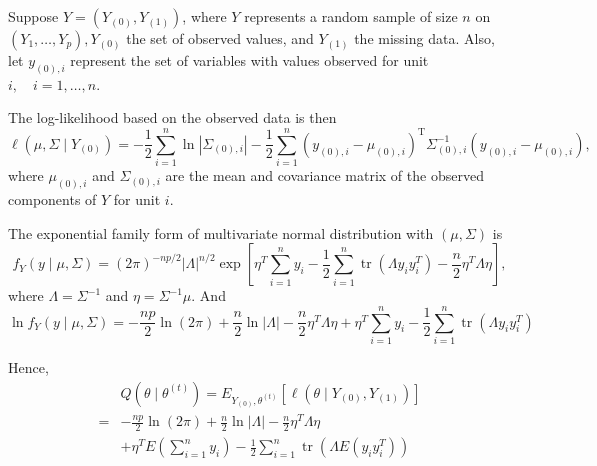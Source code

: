 \begin{example}
	Suppose $Y=\left(Y_{(0)}, Y_{(1)}\right)$, where $Y$ represents a random sample of size $n$ on $\left(Y_{1}, \ldots, Y_{p}\right), Y_{(0)}$ the set of observed values, and $Y_{(1)}$ the missing data. Also, let $y_{(0), i}$ represent the set of variables with values observed for unit $i, \quad i=1, \ldots, n$.

	The log-likelihood based on the observed data is then
	\begin{equation}
		\ell\left(\mu, \Sigma \mid Y_{(0)}\right)=-\frac{1}{2} \sum_{i=1}^{n} \ln \left|\Sigma_{(0), i}\right|-\frac{1}{2} \sum_{i=1}^{n}\left(y_{(0), i}-\mu_{(0), i}\right)^{\mathrm{T}} \Sigma_{(0), i}^{-1}\left(y_{(0), i}-\mu_{(0), i}\right),
	\end{equation}
	where $\mu_{(0), i}$ and $\Sigma_{(0), i}$ are the mean and covariance matrix of the observed components of $Y$ for unit $i$.

	The exponential family form of multivariate normal distribution with $\left(\mu,\Sigma\right)$ is
	\begin{equation}
		f_{Y}(y\mid\mu,\Sigma)=(2\pi)^{-np/2}|\Lambda|^{n/2}\exp\left[\eta^{T}\sum_{i=1}^{n}y_{i}-\frac{1}{2}\sum_{i=1}^{n}\operatorname{tr}\left(\Lambda y_{i}y_{i}^{T}\right)-\frac{n}{2}\eta^{T}\Lambda\eta\right],
	\end{equation}
	where $\Lambda=\Sigma^{-1}$ and $\eta=\Sigma^{-1}\mu$. And
	\begin{equation}
		\ln f_{Y}(y\mid\mu,\Sigma)=-\frac{np}{2}\ln(2\pi)+\frac{n}{2}\ln|\Lambda|-\frac{n}{2}\eta^{T}\Lambda\eta+\eta^{T}\sum_{i=1}^{n}y_{i}-\frac{1}{2}\sum_{i=1}^{n}\operatorname{tr}\left(\Lambda y_{i}y_{i}^{T}\right)
	\end{equation}

	Hence,
	\begin{equation}
		\begin{aligned}
			  & Q\left(\theta\mid\theta^{(t)}\right)=E_{Y_{(0)},\theta^{(t)}}\left[\ell\left(\theta\mid Y_{(0)},Y_{(1)}\right)\right]                  \\
			= & -\frac{np}{2}\ln(2\pi)+\frac{n}{2}\ln|\Lambda|-\frac{n}{2}\eta^{T}\Lambda\eta                                                          \\
			  & +\eta^{T}E\left(\sum_{i=1}^{n}y_{i}\right)-\frac{1}{2}\sum_{i=1}^{n}\operatorname{tr}\left(\Lambda E\left(y_{i}y_{i}^{T}\right)\right)
		\end{aligned}
	\end{equation}


\end{example}
